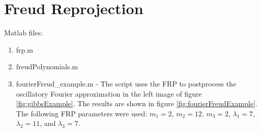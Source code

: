 \documentclass[12pt]{article}
\begin{document}
\section{Freud Reprojection}

Matlab files:
\begin{enumerate}
  \item frp.m
  \item freudPolynomials.m
  \item fourierFreud\_example.m - The script uses the FRP to postprocess the oscillatory Fourier approximation in the left image of figure \ref{fig:gibbsExample}. The results are shown in figure \ref{fig:fourierFreudExample}.  The following FRP parameters were used: $m_1 =2$, $m_2 = 12$,  $m_3= 2$, $\lambda_1 = 7$, $\lambda_2 = 11$, and $\lambda_3 = 7$.
\end{enumerate}
\end{document}
